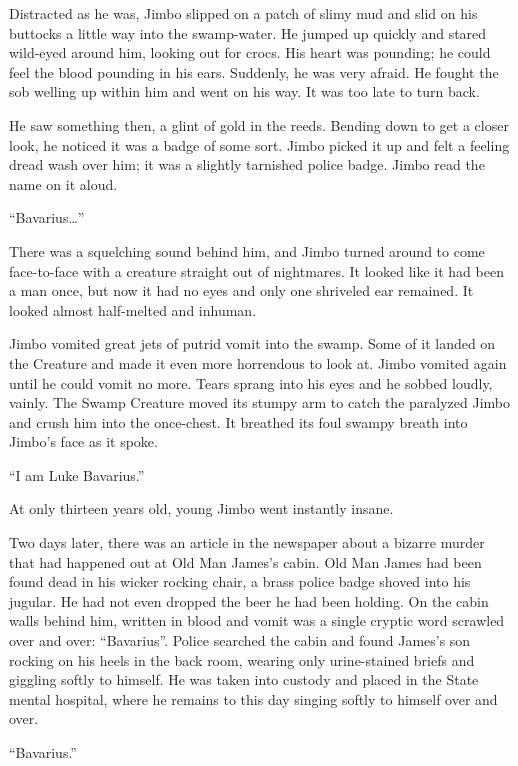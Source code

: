 Distracted as he was, Jimbo slipped on a patch of slimy mud and
slid on his buttocks a little way into the swamp-water. He jumped
up quickly and stared wild-eyed around him, looking out for crocs.
His heart was pounding; he could feel the blood pounding in his
ears. Suddenly, he was very afraid. He fought the sob welling up
within him and went on his way. It was too late to turn back.

He saw something then, a glint of gold in the reeds. Bending down
to get a closer look, he noticed it was a badge of some sort. Jimbo
picked it up and felt a feeling dread wash over him; it was a
slightly tarnished police badge. Jimbo read the name on it
aloud.

``Bavarius{\ldots}''

There was a squelching sound behind him, and Jimbo turned around to
come face-to-face with a creature straight out of nightmares. It
looked like it had been a man once, but now it had no eyes and only
one shriveled ear remained. It looked almost half-melted and
inhuman.

Jimbo vomited great jets of putrid vomit into the swamp. Some of it
landed on the Creature and made it even more horrendous to look at.
Jimbo vomited again until he could vomit no more. Tears sprang into
his eyes and he sobbed loudly, vainly. The Swamp Creature moved its
stumpy arm to catch the paralyzed Jimbo and crush him into the
once-chest. It breathed its foul swampy breath into Jimbo's
face as it spoke.

``I am Luke Bavarius.''

At only thirteen years old, young Jimbo went instantly
insane.



Two days later, there was an article in the newspaper about a
bizarre murder that had happened out at Old Man James's
cabin. Old Man James had been found dead in his wicker rocking
chair, a brass police badge shoved into his jugular. He had not
even dropped the beer he had been holding. On the cabin walls
behind him, written in blood and vomit was a single cryptic word
scrawled over and over: ``Bavarius''. Police searched the
cabin and found James's son rocking on his heels in the back
room, wearing only urine-stained briefs and giggling softly to
himself. He was taken into custody and placed in the State mental
hospital, where he remains to this day singing softly to himself
over and over.

``Bavarius.'' 
 



